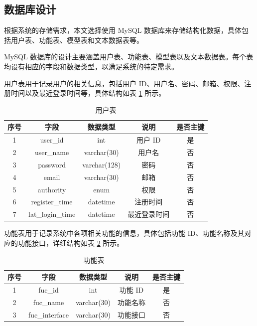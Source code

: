 \subsection{数据库设计}
\label{sec:sys-db}

根据系统的存储需求，本文选择使用 MySQL 数据库来存储结构化数据，具体包括用户表、功能表、模型表和文本数据表等。

MySQL 数据库的设计主要涵盖用户表、功能表、模型表以及文本数据表。每个表均设有相应的字段和数据类型，以满足系统的特定需求。

用户表用于记录用户的相关信息，包括用户 ID、用户名、密码、邮箱、权限、注册时间以及最近登录时间等，具体结构如表 \ref{tab:user-table} 所示。

\begin{table}[htb]
    \centering
    \caption{用户表} \label{tab:user-table}
    \begin{tabular}{ccccc}
        \toprule
        \textbf{序号} & \textbf{字段} & \textbf{数据类型} & \textbf{说明} & \textbf{是否主键} \\
        \midrule
        1 & user\_id & int & 用户 ID & 是 \\
        2 & user\_name & varchar(30) & 用户名 & 否 \\
        3 & password & varchar(128) & 密码 & 否 \\
        4 & email & varchar(30) & 邮箱 & 否 \\
        5 & authority & enum & 权限 & 否 \\
        6 & register\_time & datetime & 注册时间 & 否 \\
        7 & lat\_login\_time & datetime & 最近登录时间 & 否 \\
        \bottomrule
    \end{tabular}
\end{table}

功能表用于记录系统中各项相关功能的信息，具体包括功能 ID、功能名称及其对应的功能接口，详细结构如表 \ref{tab:func-table} 所示。

\begin{table}[htb]
    \centering
    \caption{功能表} \label{tab:func-table}
    \begin{tabular}{ccccc}
        \toprule
        \textbf{序号} & \textbf{字段} & \textbf{数据类型} & \textbf{说明} & \textbf{是否主键} \\
        \midrule
        1 & fuc\_id & int & 功能 ID & 是 \\
        2 & fuc\_name & varchar(30) & 功能名称 & 否 \\
        3 & fuc\_interface & varchar(30) & 功能接口 & 否 \\
        \bottomrule
    \end{tabular}
\end{table}


